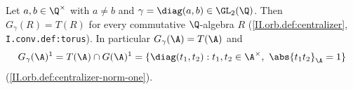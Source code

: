 Let $a,b\in\Q^\times$ with $a\neq b$ and $\gamma=\diag(a,b)\in\GL_2(\Q)$. Then $G_\gamma(R)=T(R)$ for every commutative $\Q$-algebra $R$
(\cref{II.orb.def:centralizer}, \texttt{I.conv.def:torus}). In particular $G_\gamma(\A)=T(\A)$ and
\[
  G_\gamma(\A)^1=T(\A)\cap G(\A)^1=\{\diag(t_1,t_2):t_1,t_2\in\A^\times,\ \abs{t_1t_2}_\A=1\}
\]
(\cref{II.orb.def:centralizer-norm-one}).
